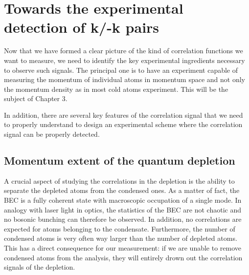 %   

\section{Towards the experimental detection of k/-k pairs}

Now that we have formed a clear picture of the kind of correlation functions we want to measure, we need to identify the key experimental ingredients necessary to observe such signals. The principal one is to have an experiment capable of measuring the momentum of individual atoms in momentum space and not only the momentum density as in most cold atoms experiment. This will be the subject of Chapter 3. 

In addition, there are several key features of the \kmk correlation signal that we need to properly understand to design an experimental scheme where the \kmk correlation signal can be properly detected.

\subsection{Momentum extent of the quantum depletion}

A crucial aspect of studying the correlations in the depletion is the ability to separate the depleted atoms from the condensed ones. As a matter of fact, the BEC is a fully coherent state with macroscopic occupation of a single mode. In analogy with laser light in optics, the statistics of the BEC are not chaotic and no bosonic bunching can therefore be observed. In addition, no \kmk correlations are expected for atoms belonging to the condensate. Furthermore, the number of condensed atoms is very often way larger than the number of depleted atoms. This has a direct consequence for our measurement: if we are unable to remove condensed atoms from the analysis, they will entirely drown out the correlation signals of the depletion.

